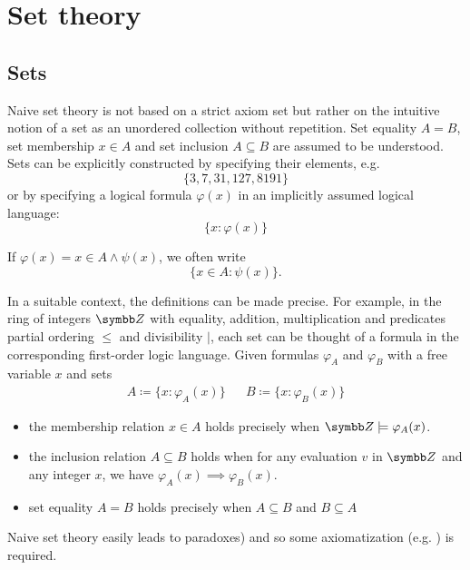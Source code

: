 \section{Set theory}\label{sec:set_theory}
\subsection{Sets}\label{subsec:sets}

\begin{definition}\label{def:set_naive}\cite[chapter 1]{Enderton1977}
  Naive set theory is not based on a strict axiom set but rather on the intuitive notion of a set as an unordered collection without repetition. Set equality \( A = B \), set membership \( x \in A \) and set inclusion \( A \subseteq B \) are assumed to be understood. Sets can be explicitly constructed by specifying their elements, e.g.
  \begin{equation*}
    \{ 3, 7, 31, 127, 8191 \}
  \end{equation*}
  or by specifying a logical formula \( \varphi(x) \) in an implicitly assumed logical language:
  \begin{equation*}
    \{ x \colon \varphi(x) \}
  \end{equation*}

  If \( \varphi(x) = x \in A \land \psi(x) \), we often write
  \begin{equation*}
    \{ x \in A \colon \psi(x) \}.
  \end{equation*}

  In a suitable context, the definitions can be made precise. For example, in the ring of integers \( \BZ \) with equality, addition, multiplication and predicates partial ordering \( \leq \) and divisibility \( \vert \), each set can be thought of a formula in the corresponding first-order logic language. Given formulas \( \varphi_A \) and \( \varphi_B \) with a free variable \( x \) and sets
  \begin{align*}
    A \coloneqq \{ x \colon \varphi_A(x) \} && B \coloneqq \{ x \colon \varphi_B(x) \}
  \end{align*}

  \begin{itemize}
    \item the membership relation \( x \in A \) holds precisely when \( \BZ \models \varphi_A(x) \).

    \item the inclusion relation \( A \subseteq B \) holds when for any evaluation \( v \) in \( \BZ \) and any integer \( x \), we have \( \varphi_A(x) \implies \varphi_B(x) \).

    \item set equality \( A = B \) holds precisely when \( A \subseteq B \) and \( B \subseteq A \)
  \end{itemize}

  Naive set theory easily leads to paradoxes) and so some axiomatization (e.g. ) is required.
\end{definition}

